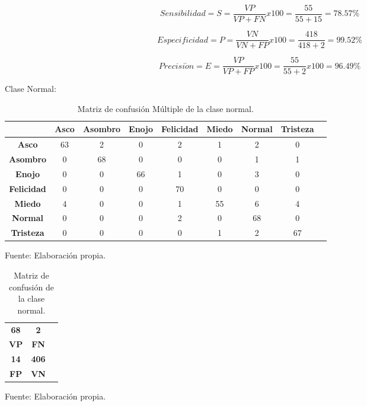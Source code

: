 \begin{equation}
Sensibilidad=S=\frac{VP}{VP+FN}x100=\frac{55}{55+15}=78.57\%
\end{equation}

\begin{equation}
Especificidad=P=\frac{VN}{VN+FP}x100=\frac{418}{418+2}=99.52\%
\end{equation}

\begin{equation}
Precisi\acute{o}n=E=\frac{VP}{VP+FP}x100=\frac{55}{55+2}x100=96.49\%
\end{equation}

\vskip 5cm

Clase Normal:

\begin{table}[ht!]
\centering
\caption{Matriz de confusión Múltiple de la clase normal.} \vskip 0.1cm
\begin{tabular}{|c|c|c|c|c|c|c|c|c|} \hline
 & \bf Asco & \bf Asombro & \bf Enojo & \bf Felicidad & \bf Miedo & \bf Normal & \bf Tristeza \\ \hline
\bf Asco & 63 & 2 & 0 & 2 & 1 & 2 & 0 \\ \hline
\bf Asombro & 0 & 68 & 0 & 0 & 0 & 1 & 1 \\ \hline
\bf Enojo & 0 & 0 & 66 & 1 & 0 & 3 & 0 \\ \hline
\bf Felicidad & 0 & 0 & 0 & 70 & 0 & 0 & 0 \\ \hline
\bf Miedo & 4 & 0 & 0 & 1 & 55 & 6 & 4 \\ \hline
\bf Normal & 0 & 0 & 0 & 2 & 0 & 68 & 0 \\ \hline
\bf Tristeza & 0 & 0 & 0 & 0 & 1 & 2 & 67 \\ \hline

\end{tabular}
\begin{center}
{\small{Fuente: Elaboración propia.}}
\end{center}
\end{table}

\begin{table}[ht!]
\centering
\caption{Matriz de confusión de la clase normal.} \vskip 0.1cm
\begin{tabular}{|c|c|c|} \hline
\bf 68 \par & \bf 2 \par \\
\bf VP & \bf FN \\ \hline
\bf 14 \par & \bf 406 \par \\ 
\bf FP & \bf VN \\ \hline 
\end{tabular}
\begin{center}
{\small{Fuente: Elaboración propia.}}
\end{center}
\end{table}

